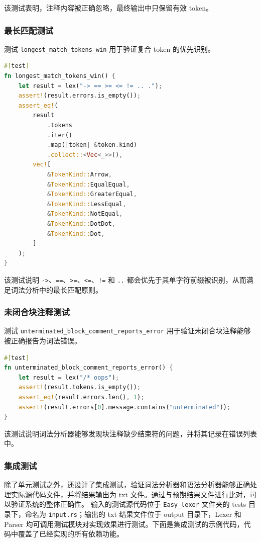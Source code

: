 \documentclass[UTF8,a4paper,12pt]{ctexart}
\begin{document}
该测试表明，注释内容被正确忽略，最终输出中只保留有效 token。

\subsubsection{最长匹配测试}

测试 \texttt{longest\_match\_tokens\_win} 用于验证复合 token 的优先识别。

\begin{lstlisting}[language=Rust,caption={最长匹配测试}]
#[test]
fn longest_match_tokens_win() {
    let result = lex("-> == >= <= != .. .");
    assert!(result.errors.is_empty());
    assert_eq!(
        result
            .tokens
            .iter()
            .map(|token| &token.kind)
            .collect::<Vec<_>>(),
        vec![
            &TokenKind::Arrow,
            &TokenKind::EqualEqual,
            &TokenKind::GreaterEqual,
            &TokenKind::LessEqual,
            &TokenKind::NotEqual,
            &TokenKind::DotDot,
            &TokenKind::Dot,
        ]
    );
}
\end{lstlisting}

该测试说明 \texttt{->}、\texttt{==}、\texttt{>=}、\texttt{<=}、\texttt{!=} 和 \texttt{..} 都会优先于其单字符前缀被识别，从而满足词法分析中的最长匹配原则。

\subsubsection{未闭合块注释测试}

测试 \texttt{unterminated\_block\_comment\_reports\_error} 用于验证未闭合块注释能够被正确报告为词法错误。

\begin{lstlisting}[language=Rust,caption={未闭合块注释测试}]
#[test]
fn unterminated_block_comment_reports_error() {
    let result = lex("/* oops");
    assert!(result.tokens.is_empty());
    assert_eq!(result.errors.len(), 1);
    assert!(result.errors[0].message.contains("unterminated"));
}
\end{lstlisting}

该测试说明词法分析器能够发现块注释缺少结束符的问题，并将其记录在错误列表中。

\subsubsection{集成测试}
除了单元测试之外，还设计了集成测试，验证词法分析器和语法分析器能够正确处理实际源代码文件，并将结果输出为 txt 文件。通过与预期结果文件进行比对，可以验证系统的整体正确性。
输入的测试源代码位于 \texttt{Easy\_lexer} 文件夹的 tests 目录下，命名为 \texttt{input.rs}；输出的 txt 结果文件位于 output 目录下，Lexer 和 Parser 均可调用测试模块对实现效果进行测试。下面是集成测试的示例代码，代码中覆盖了已经实现的所有依赖功能。
\end{document}
